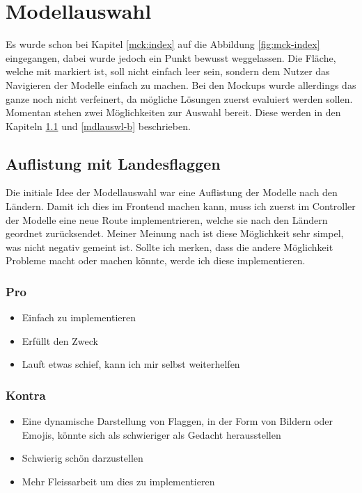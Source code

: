 \section{Modellauswahl}
Es wurde schon bei Kapitel \ref{mck:index} auf die Abbildung \ref{fig:mck-index} eingegangen, dabei wurde jedoch ein Punkt bewusst weggelassen. Die Fläche, welche mit  markiert ist, soll nicht einfach leer sein, sondern dem Nutzer das Navigieren der Modelle einfach zu machen.
\newline
Bei den Mockups wurde allerdings das ganze noch nicht verfeinert, da mögliche Lösungen zuerst evaluiert werden sollen. Momentan stehen zwei Möglichkeiten zur Auswahl bereit. Diese werden in den Kapiteln \ref{mdlauswl-a} und \ref{mdlauswl-b} beschrieben.
\subsection{Auflistung mit Landesflaggen} \label{mdlauswl-a}
Die initiale Idee der Modellauswahl war eine Auflistung der Modelle nach den Ländern. Damit ich dies im Frontend machen kann, muss ich zuerst im Controller der Modelle eine neue Route implementrieren, welche sie nach den Ländern geordnet zurücksendet.
\newline
Meiner Meinung nach ist diese Möglichkeit sehr simpel, was nicht negativ gemeint ist. Sollte ich merken, dass die andere Möglichkeit Probleme macht oder machen könnte, werde ich diese implementieren.
\subsubsection{Pro}
\begin{itemize}
  \item Einfach zu implementieren
  \item Erfüllt den Zweck
  \item Lauft etwas schief, kann ich mir selbst weiterhelfen
\end{itemize}
\subsubsection{Kontra}
\begin{itemize}
  \item Eine dynamische Darstellung von Flaggen, in der Form von Bildern oder Emojis, könnte sich als schwieriger als Gedacht herausstellen
  \item Schwierig schön darzustellen
  \item Mehr Fleissarbeit um dies zu implementieren
\end{itemize}

